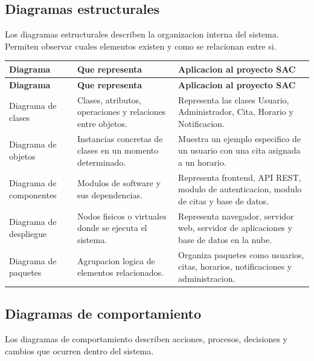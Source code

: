 \documentclass[12pt,letterpaper]{article}
\begin{document}
\subsection{Diagramas estructurales}

Los diagramas estructurales describen la organizacion interna del sistema. Permiten observar cuales elementos existen y como se relacionan entre si.

\begin{longtable}{|p{3.7cm}|p{5cm}|p{6.4cm}|}
\hline
\textbf{Diagrama} & \textbf{Que representa} & \textbf{Aplicacion al proyecto SAC} \\
\hline
\endfirsthead
\hline
\textbf{Diagrama} & \textbf{Que representa} & \textbf{Aplicacion al proyecto SAC} \\
\hline
\endhead
\hline
\endfoot
\hline
\endlastfoot

Diagrama de clases & Clases, atributos, operaciones y relaciones entre objetos. & Representa las clases Usuario, Administrador, Cita, Horario y Notificacion. \\
\hline

Diagrama de objetos & Instancias concretas de clases en un momento determinado. & Muestra un ejemplo especifico de un usuario con una cita asignada a un horario. \\
\hline

Diagrama de componentes & Modulos de software y sus dependencias. & Representa frontend, API REST, modulo de autenticacion, modulo de citas y base de datos. \\
\hline

Diagrama de despliegue & Nodos fisicos o virtuales donde se ejecuta el sistema. & Representa navegador, servidor web, servidor de aplicaciones y base de datos en la nube. \\
\hline

Diagrama de paquetes & Agrupacion logica de elementos relacionados. & Organiza paquetes como usuarios, citas, horarios, notificaciones y administracion. \\
\hline
\end{longtable}

\subsection{Diagramas de comportamiento}

Los diagramas de comportamiento describen acciones, procesos, decisiones y cambios que ocurren dentro del sistema.
\end{document}
